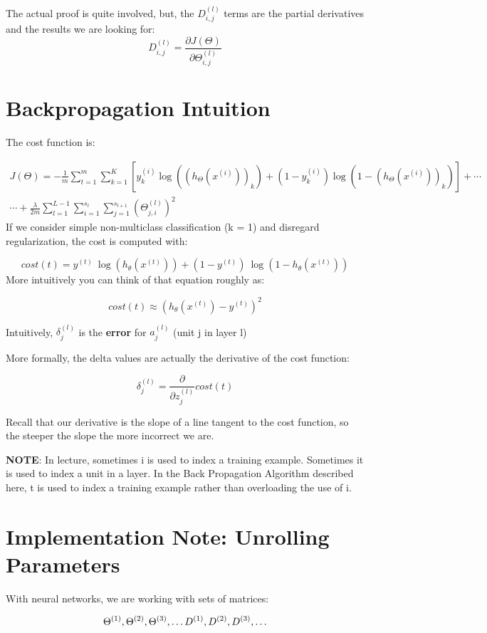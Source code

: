The actual proof is quite involved, but, the $D^{(l)}_{i,j}$ terms are the partial derivatives and the results we are looking for:
\begin{equation}
D_{i,j}^{(l)} = \dfrac{\partial J(\Theta)}{\partial \Theta_{i,j}^{(l)}}
\end{equation}
\section{Backpropagation Intuition}
The cost function is:

\begin{multline}
J(\Theta) = - \frac{1}{m} \sum_{t=1}^m \sum_{k=1}^K \left[y^{(i)}_k \log ((h_\Theta (x^{(i)}))_k) + (1 - y^{(i)}_k)\log (1 - (h_\Theta(x^{(i)}))_k)\right] + \cdots \\
\cdots + \frac{\lambda}{2m}\sum_{l=1}^{L-1} \sum_{i=1}^{s_l} \sum_{j=1}^{s_{l+1}} (\Theta_{j,i}^{(l)})^2
\end{multline}
If we consider simple non-multiclass classification (k = 1) and disregard regularization, the cost is computed with:

$$cost(t) =y^{(t)} \ \log (h_\theta (x^{(t)})) + (1 - y^{(t)})\ \log (1 - h_\theta(x^{(t)}))$$
More intuitively you can think of that equation roughly as:

$$cost(t) \approx (h_\theta(x^{(t)})-y^{(t)})^2$$

Intuitively, $\delta_j^{(l)}$ is the \textbf{error} for $a^{(l)}_j$ (unit j in layer l)

More formally, the delta values are actually the derivative of the cost function:

$$\delta_j^{(l)} = \dfrac{\partial}{\partial z_j^{(l)}} cost(t)$$

Recall that our derivative is the slope of a line tangent to the cost function, so the steeper the slope the more incorrect we are.

\textbf{NOTE}: In lecture, sometimes i is used to index a training example. Sometimes it is used to index a unit in a layer. In the Back Propagation Algorithm described here, t is used to index a training example rather than overloading the use of i.

\section{Implementation Note: Unrolling Parameters}
With neural networks, we are working with sets of matrices:

\begin{align*}
\Theta^{(1)}, \Theta^{(2)}, \Theta^{(3)}, \dots \newline
D^{(1)}, D^{(2)}, D^{(3)}, \dots
\end{align*}

